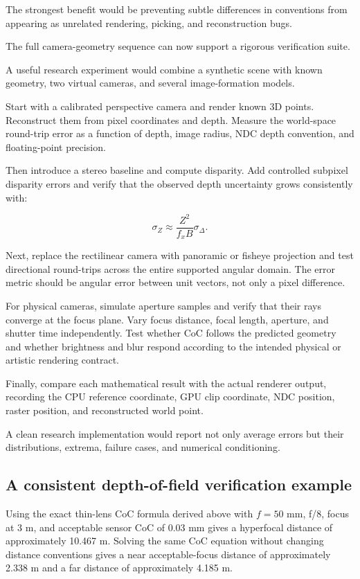 The strongest benefit would be preventing subtle differences in conventions from appearing as unrelated rendering, picking, and reconstruction bugs.

The full camera-geometry sequence can now support a rigorous verification suite.

A useful research experiment would combine a synthetic scene with known geometry, two virtual cameras, and several image-formation models.

Start with a calibrated perspective camera and render known 3D points. Reconstruct them from pixel coordinates and depth. Measure the world-space round-trip error as a function of depth, image radius, NDC depth convention, and floating-point precision.

Then introduce a stereo baseline and compute disparity. Add controlled subpixel disparity errors and verify that the observed depth uncertainty grows consistently with:

\[ \boxed{ \sigma_Z\approx\frac{Z^2}{f_xB}\sigma_\Delta. } \]

Next, replace the rectilinear camera with panoramic or fisheye projection and test directional round-trips across the entire supported angular domain. The error metric should be angular error between unit vectors, not only a pixel difference.

For physical cameras, simulate aperture samples and verify that their rays converge at the focus plane. Vary focus distance, focal length, aperture, and shutter time independently. Test whether CoC follows the predicted geometry and whether brightness and blur respond according to the intended physical or artistic rendering contract.

Finally, compare each mathematical result with the actual renderer output, recording the CPU reference coordinate, GPU clip coordinate, NDC position, raster position, and reconstructed world point.

A clean research implementation would report not only average errors but their distributions, extrema, failure cases, and numerical conditioning.

\subsection{A consistent depth-of-field verification example}\label{02-foundations-ii-ch037-a-consistent-depth-of-field-verification-example}

Using the exact thin-lens CoC formula derived above with \(f=50\) mm, f/8, focus at 3 m, and acceptable sensor CoC of 0.03 mm gives a hyperfocal distance of approximately 10.467 m. Solving the same CoC equation without changing distance conventions gives a near acceptable-focus distance of approximately 2.338 m and a far distance of approximately 4.185 m.

